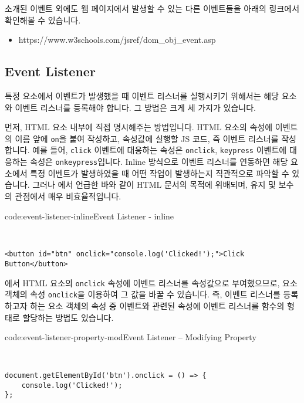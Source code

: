 소개된 이벤트 외에도 웹 페이지에서 발생할 수 있는 다른 이벤트들을 아래의 링크에서 확인해볼 수 있습니다.

\begin{itemize}
    \item https://www.w3schools.com/jsref/dom\_obj\_event.asp
\end{itemize}

\subsection*{Event Listener}

특정 요소에서 이벤트가 발생했을 때 이벤트 리스너를 실행시키기 위해서는 해당 요소와 이벤트 리스너를 등록해야 합니다. 그 방법은 크게 세 가지가 있습니다.

먼저, HTML 요소 내부에 직접 명시해주는 방법입니다. HTML 요소의 속성에 이벤트의 이름 앞에 \texttt{on}을 붙여 작성하고, 속성값에 실행할 JS 코드, 즉 이벤트 리스너를 작성합니다. 예를 들어, \texttt{click} 이벤트에 대응하는 속성은 \texttt{onclick}, \texttt{keypress} 이벤트에 대응하는 속성은 \texttt{onkeypress}입니다. Inline 방식으로 이벤트 리스너를 연동하면 해당 요소에서 특정 이벤트가 발생하였을 때 어떤 작업이 발생하는지 직관적으로 파악할 수 있습니다. 그러나 에서 언급한 바와 같이 HTML 문서의 목적에 위배되며, 유지 및 보수의 관점에서 매우 비효율적입니다.

\begin{codeenv}{code:event-listener-inline}{Event Listener - inline}\begin{verbatim}


<button id="btn" onclick="console.log('Clicked!');">Click Button</button>
\end{verbatim}
\end{codeenv}

에서 HTML 요소의 \texttt{onclick} 속성에 이벤트 리스너를 속성값으로 부여했으므로, 요소 객체의 속성 \texttt{onclick}을 이용하여 그 값을 바꿀 수 있습니다. 즉, 이벤트 리스너를 등록하고자 하는 요소 객체의 속성 중 이벤트와 관련된 속성에 이벤트 리스너를 함수의 형태로 할당하는 방법도 있습니다.

\begin{codeenv}{code:event-listener-property-mod}{Event Listener – Modifying Property}\begin{verbatim}


document.getElementById('btn').onclick = () => {
    console.log('Clicked!');
};
\end{verbatim}
\end{codeenv}

